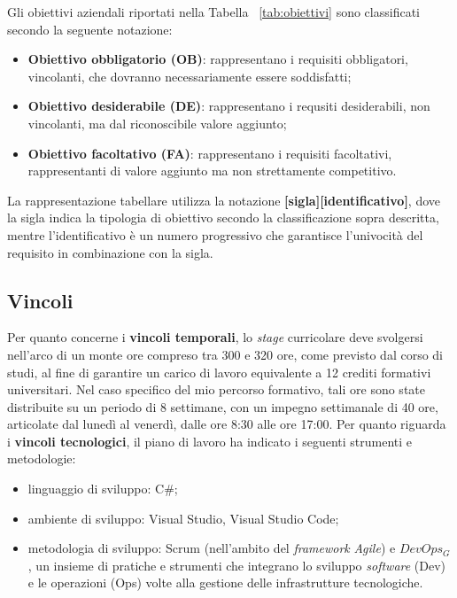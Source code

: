         \noindent Gli obiettivi aziendali riportati nella Tabella ~\ref{tab:obiettivi} sono classificati secondo la seguente notazione:
        \begin{itemize}
            \item \textbf{Obiettivo obbligatorio (OB)}: rappresentano i requisiti obbligatori, vincolanti, che dovranno necessariamente essere soddisfatti;
            \item \textbf{Obiettivo desiderabile (DE)}: rappresentano i requsiti desiderabili, non vincolanti, ma dal riconoscibile valore aggiunto;
            \item \textbf{Obiettivo facoltativo (FA)}: rappresentano i requisiti facoltativi, rappresentanti di valore aggiunto ma non strettamente competitivo.
        \end{itemize}
        La rappresentazione tabellare utilizza la notazione \textbf{[sigla][identificativo]}, dove la sigla indica la tipologia di obiettivo secondo la classificazione sopra descritta, mentre l'identificativo è un numero progressivo che garantisce l'univocità del requisito in combinazione con la sigla. 

        \subsection{Vincoli}
        
        Per quanto concerne i \textbf{vincoli temporali}, lo \textit{stage} curricolare deve svolgersi nell'arco di un monte ore compreso tra 300 e 320 ore, come previsto dal corso di studi, al fine di garantire un carico di lavoro equivalente a 12 crediti formativi universitari. Nel caso specifico del mio percorso formativo, tali ore sono state distribuite su un periodo di 8 settimane, con un impegno settimanale di 40 ore, articolate dal lunedì al venerdì, dalle ore 8:30 alle ore 17:00.   
        \newpage
        \noindent Per quanto riguarda i \textbf{vincoli tecnologici}, il piano di lavoro ha indicato i seguenti strumenti e metodologie:  
        \begin{itemize}
            \item linguaggio di sviluppo: C\#;
            \item ambiente di sviluppo: Visual Studio, Visual Studio Code;  
            \item metodologia di sviluppo: Scrum (nell'ambito del \textit{framework} \textit{Agile}) e $DevOps_G$, un insieme di pratiche e strumenti che integrano lo sviluppo \textit{software} (Dev) e le operazioni (Ops) volte alla gestione delle infrastrutture tecnologiche. 
        \end{itemize}


